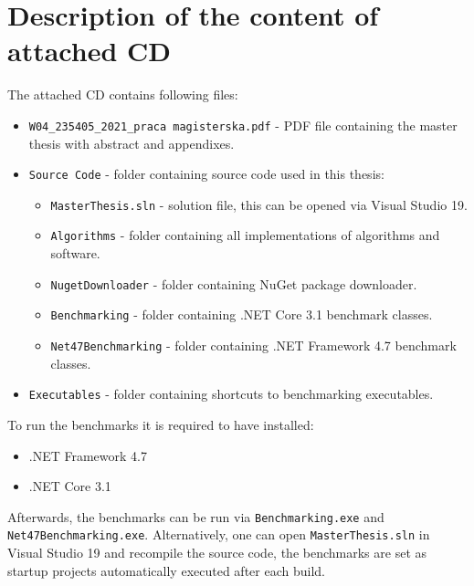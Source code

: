 \chapter{Description of the content of attached CD}

The attached CD contains following files:
\begin{itemize}
	\item \texttt{W04\_235405\_2021\_praca magisterska.pdf} - PDF file containing the master thesis with abstract and appendixes.
	\item \texttt{Source Code} - folder containing source code used in this thesis:
	\begin{itemize}
		\item \texttt{MasterThesis.sln} - solution file, this can be opened via Visual Studio 19.
		\item \texttt{Algorithms} - folder containing all implementations of algorithms and software.
		\item \texttt{NugetDownloader} - folder containing NuGet package downloader.
		\item \texttt{Benchmarking} - folder containing .NET Core 3.1 benchmark classes.
		\item \texttt{Net47Benchmarking} - folder containing .NET Framework 4.7 benchmark classes.
	\end{itemize}
	\item \texttt{Executables} - folder containing shortcuts to benchmarking executables.
\end{itemize}

To run the benchmarks it is required to have installed:
\begin{itemize}
	\item .NET Framework 4.7
	\item .NET Core 3.1
\end{itemize}

Afterwards, the benchmarks can be run via \texttt{Benchmarking.exe} and \texttt{Net47Benchmarking.exe}.
Alternatively, one can open \texttt{MasterThesis.sln} in Visual Studio 19 and recompile the source code,
the benchmarks are set as startup projects automatically executed after each build.
